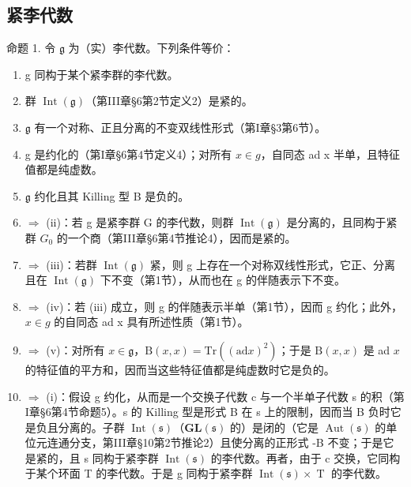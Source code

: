 \subsection{紧李代数}

命题 1. 令 \(\mathfrak{g}\) 为（实）李代数。下列条件等价：

\begin{enumerate}
\def\labelenumi{(\roman{enumi})}
\item
  g 同构于某个紧李群的李代数。
\item
  群 \(\operatorname{Int}(\mathfrak{g})\)（第III章§6第2节定义2）是紧的。
\item
  \(\mathfrak{g}\) 有一个对称、正且分离的不变双线性形式（第I章§3第6节）。
\item
  g 是约化的（第I章§6第4节定义4）；对所有 \(x \in g\)，自同态 ad x 半单，且特征值都是纯虚数。
\item
  \(\mathfrak{g}\) 约化且其 Killing 型 B 是负的。
\item
  \(\Longrightarrow\) (ii)：若 g 是紧李群 G 的李代数，则群 \(\operatorname{Int}(\mathfrak{g})\) 是分离的，且同构于紧群 \(G_{0}\) 的一个商（第III章§6第4节推论4），因而是紧的。
\item
  \(\Longrightarrow\) (iii)：若群 \(\operatorname{Int}(\mathfrak{g})\) 紧，则 g 上存在一个对称双线性形式，它正、分离且在 \(\operatorname{Int}(\mathfrak{g})\) 下不变（第1节），从而也在 g 的伴随表示下不变。
\item
  \(\Longrightarrow\) (iv)：若 (iii) 成立，则 g 的伴随表示半单（第1节），因而 g 约化；此外，\(x \in g\) 的自同态 ad x 具有所述性质（第1节）。
\item
  \(\Longrightarrow\) (v)：对所有 \(x\in \mathfrak{g}\)，\(\mathrm{B}(x,x) = \mathrm{Tr}((\mathrm{ad}x)^2)\)；于是 \(\mathrm{B}(x,x)\) 是 ad \(x\) 的特征值的平方和，因而当这些特征值都是纯虚数时它是负的。
\item
  \(\Longrightarrow\) (i)：假设 g 约化，从而是一个交换子代数 c 与一个半单子代数 s 的积（第I章§6第4节命题5）。s 的 Killing 型是形式 B 在 s 上的限制，因而当 B 负时它是负且分离的。子群 \(\operatorname{Int}(\mathfrak{s})\)（\(\mathbf{GL}(\mathfrak{s})\) 的）是闭的（它是 \(\operatorname{Aut}(\mathfrak{s})\) 的单位元连通分支，第III章§10第2节推论2）且使分离的正形式 -B 不变；于是它是紧的，且 s 同构于紧李群 \(\operatorname{Int}(\mathfrak{s})\) 的李代数。再者，由于 c 交换，它同构于某个环面 T 的李代数。于是 g 同构于紧李群 \(\operatorname{Int}(\mathfrak{s}) \times \operatorname{T}\) 的李代数。
\end{enumerate}

